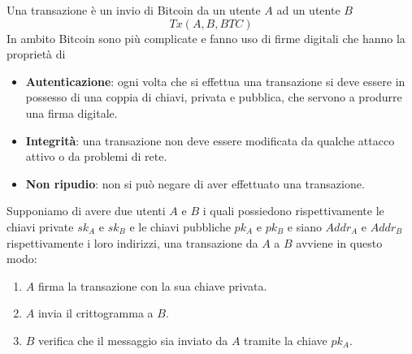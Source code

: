 Una transazione
\`e un invio di Bitcoin da un utente $A$ ad un utente $B$
\[ Tx(A, B, BTC) \]
In ambito Bitcoin sono pi\`u complicate e fanno uso di firme digitali che hanno la propriet\`a di
\begin{itemize}
	\item \textbf{Autenticazione}: ogni volta che si effettua una transazione si deve essere in possesso di una coppia
	      di chiavi, privata e pubblica, che servono a produrre una firma digitale.
	\item \textbf{Integrit\`a}: una transazione non deve essere modificata da qualche attacco attivo o da problemi di
	      rete.
	\item \textbf{Non ripudio}: non si pu\`o negare di aver effettuato una transazione.
\end{itemize}
Supponiamo di avere due utenti $A$ e $B$ i quali possiedono rispettivamente le chiavi private $sk_A$ e $sk_B$ e le
chiavi pubbliche $pk_A$ e $pk_B$ e siano $Addr_A$ e $Addr_B$ rispettivamente i loro indirizzi, una transazione da $A$
a $B$ avviene in questo modo:
\begin{enumerate}
	\item $A$ firma la transazione con la sua chiave privata.
	\item $A$ invia il crittogramma a $B$.
	\item $B$ verifica che il messaggio sia inviato da $A$ tramite la chiave $pk_A$.
\end{enumerate}